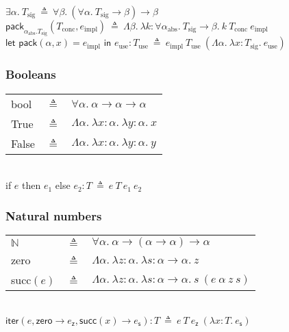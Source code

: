 \documentclass{article}
\begin{document}
$\exists\alpha.\ T_\text{sig}\ \triangleq\ \forall\beta.\ (\forall\alpha.\ T_\text{sig}\to\beta)\to\beta$\medbreak
\noindent
$\textsf{pack}_{\alpha_\text{abs}.T_\text{sig}}(T_\text{conc},e_\text{impl})\ \triangleq\ \Lambda\beta.\ \lambda k:\forall\alpha_\text{abs}.\ T_\text{sig}\to\beta.\ k\ T_\text{conc}\ e_\text{impl}$\medbreak
\noindent
$\textsf{let pack}(\alpha,x)=e_\text{impl}\textsf{ in }e_\text{use}:T_\text{use}\ \triangleq\ e_\text{impl}\ T_\text{use}\ (\Lambda\alpha.\ \lambda x:T_\text{sig}.\ e_\text{use})$

\subsubsection*{Booleans}

\hspace{-1em}
\begin{tabular}{lcl}
\textsf{bool} & \hspace{-0.5em}$\triangleq$ & \hspace{-0.5em}$\forall\alpha.\ \alpha\to\alpha\to\alpha$\\[0.5em]
\textsf{True} & \hspace{-0.5em}$\triangleq$ & \hspace{-0.5em}$\Lambda\alpha.\ \lambda x:\alpha.\ \lambda y:\alpha.\ x$\\[0.5em]
\textsf{False} & \hspace{-0.5em}$\triangleq$ & \hspace{-0.5em}$\Lambda\alpha.\ \lambda x:\alpha.\ \lambda y:\alpha.\ y$\\[0.5em]
\end{tabular}\\
\textsf{if }$e$\textsf{ then }$e_1$\textsf{ else }$e_2:T\ \triangleq\ e\ T\ e_1\ e_2$

\subsubsection*{Natural numbers}

\hspace{-1em}
\begin{tabular}{lcl}
$\mathbb{N}$ & \hspace{-0.5em}$\triangleq$ & \hspace{-0.5em}$\forall\alpha.\ \alpha\to(\alpha\to\alpha)\to\alpha$\\[0.5em]
\textsf{zero} & \hspace{-0.5em}$\triangleq$ & \hspace{-0.5em}$\Lambda\alpha.\ \lambda z:\alpha.\ \lambda s:\alpha\to\alpha.\ z$\\[0.5em]
\textsf{succ}$(e)$ & \hspace{-0.5em}$\triangleq$ & \hspace{-0.5em}$\Lambda\alpha.\ \lambda z:\alpha.\ \lambda s:\alpha\to\alpha.\ s\ (e\ \alpha\ z\ s)$\\[0.5em]
\end{tabular}\\
$\textsf{iter}(e,\textsf{zero}\to e_\textsf{z},\textsf{succ}(x)\to e_\textsf{s}):T\ \triangleq\ e\ T\ e_\textsf{z}\ (\lambda x:T.\ e_\textsf{s})$
\end{document}
